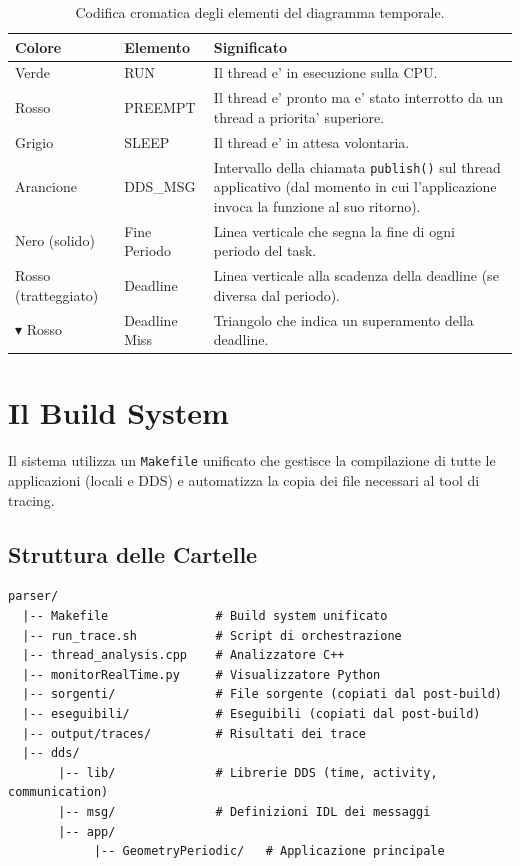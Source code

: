 \begin{table}[htbp]
\centering
\caption{Codifica cromatica degli elementi del diagramma temporale.}
\label{tab:colori}
\begin{tabular}{llp{6cm}}
\toprule
\textbf{Colore} & \textbf{Elemento} & \textbf{Significato} \\
\midrule
\textcolor[HTML]{43A047}{Verde}  & RUN & Il thread e' in esecuzione sulla CPU. \\
\textcolor[HTML]{E53935}{Rosso}  & PREEMPT & Il thread e' pronto ma e' stato
    interrotto da un thread a priorita' superiore. \\
\textcolor[HTML]{90A4AE}{Grigio} & SLEEP & Il thread e' in attesa volontaria. \\
\textcolor[HTML]{FF6F00}{Arancione} & DDS\_MSG & Intervallo della chiamata
    \texttt{publish()} sul thread applicativo (dal momento in cui
    l'applicazione invoca la funzione al suo ritorno). \\
Nero (solido)  & Fine Periodo & Linea verticale che segna la fine
    di ogni periodo del task. \\
Rosso (tratteggiato) & Deadline & Linea verticale alla scadenza della
    deadline (se diversa dal periodo). \\
$\blacktriangledown$ Rosso & Deadline Miss & Triangolo che indica un
    superamento della deadline. \\
\bottomrule
\end{tabular}
\end{table}


\section{Il Build System}
\label{sec:build}

Il sistema utilizza un \texttt{Makefile} unificato che gestisce la
compilazione di tutte le applicazioni (locali e DDS) e automatizza
la copia dei file necessari al tool di tracing.

\subsection{Struttura delle Cartelle}
\label{subsec:folders}

\begin{verbatim}
parser/
  |-- Makefile               # Build system unificato
  |-- run_trace.sh           # Script di orchestrazione
  |-- thread_analysis.cpp    # Analizzatore C++
  |-- monitorRealTime.py     # Visualizzatore Python
  |-- sorgenti/              # File sorgente (copiati dal post-build)
  |-- eseguibili/            # Eseguibili (copiati dal post-build)
  |-- output/traces/         # Risultati dei trace
  |-- dds/
       |-- lib/              # Librerie DDS (time, activity, communication)
       |-- msg/              # Definizioni IDL dei messaggi
       |-- app/
            |-- GeometryPeriodic/   # Applicazione principale
\end{verbatim}

